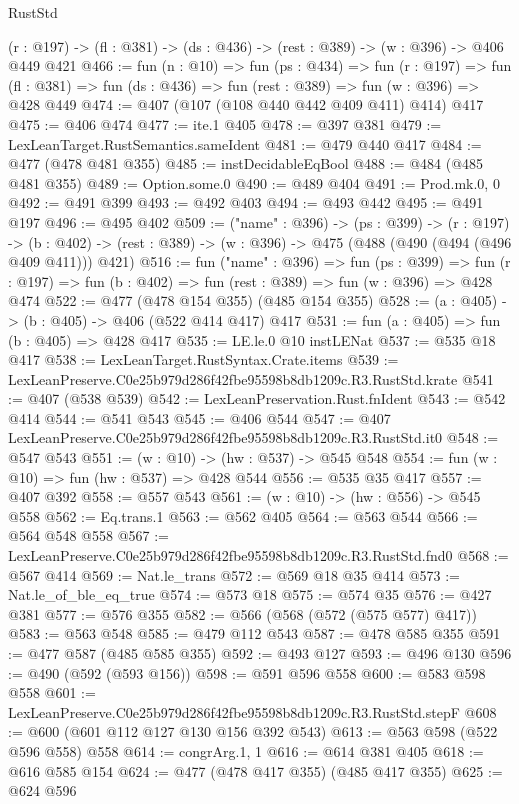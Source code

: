 \begin{lexlean}{RustStd}
\begin{coremodule}
  (r : @197) -> (fl : @381) -> (ds : @436) -> (rest : @389) -> (w : @396) -> @406 @449 @421
@466 := fun (n : @10) =>
  fun (ps : @434) =>
  fun (r : @197) =>
  fun (fl : @381) => fun (ds : @436) => fun (rest : @389) => fun (w : @396) => @428 @449
@474 := @407 (@107 (@108 @440 @442 @409 @411) @414) @417
@475 := @406 @474
@477 := ite.{1} @405
@478 := @397 @381
@479 := LexLeanTarget.RustSemantics.sameIdent
@481 := @479 @440 @417
@484 := @477 (@478 @481 @355)
@485 := instDecidableEqBool
@488 := @484 (@485 @481 @355)
@489 := Option.some.{0}
@490 := @489 @404
@491 := Prod.mk.{0, 0}
@492 := @491 @399
@493 := @492 @403
@494 := @493 @442
@495 := @491 @197
@496 := @495 @402
@509 := ("name" : @396) ->
  (ps : @399) ->
  (r : @197) ->
  (b : @402) -> (rest : @389) -> (w : @396) -> @475 (@488 (@490 (@494 (@496 @409 @411))) @421)
@516 := fun ("name" : @396) =>
  fun (ps : @399) =>
  fun (r : @197) => fun (b : @402) => fun (rest : @389) => fun (w : @396) => @428 @474
@522 := @477 (@478 @154 @355) (@485 @154 @355)
@528 := (a : @405) -> (b : @405) -> @406 (@522 @414 @417) @417
@531 := fun (a : @405) => fun (b : @405) => @428 @417
@535 := LE.le.{0} @10 instLENat
@537 := @535 @18 @417
@538 := LexLeanTarget.RustSyntax.Crate.items
@539 := LexLeanPreserve.C0e25b979d286f42fbe95598b8db1209c.R3.RustStd.krate
@541 := @407 (@538 @539)
@542 := LexLeanPreservation.Rust.fnIdent
@543 := @542 @414
@544 := @541 @543
@545 := @406 @544
@547 := @407 LexLeanPreserve.C0e25b979d286f42fbe95598b8db1209c.R3.RustStd.it0
@548 := @547 @543
@551 := (w : @10) -> (hw : @537) -> @545 @548
@554 := fun (w : @10) => fun (hw : @537) => @428 @544
@556 := @535 @35 @417
@557 := @407 @392
@558 := @557 @543
@561 := (w : @10) -> (hw : @556) -> @545 @558
@562 := Eq.trans.{1}
@563 := @562 @405
@564 := @563 @544
@566 := @564 @548 @558
@567 := LexLeanPreserve.C0e25b979d286f42fbe95598b8db1209c.R3.RustStd.fnd0
@568 := @567 @414
@569 := Nat.le_trans
@572 := @569 @18 @35 @414
@573 := Nat.le_of_ble_eq_true
@574 := @573 @18
@575 := @574 @35
@576 := @427 @381
@577 := @576 @355
@582 := @566 (@568 (@572 (@575 @577) @417))
@583 := @563 @548
@585 := @479 @112 @543
@587 := @478 @585 @355
@591 := @477 @587 (@485 @585 @355)
@592 := @493 @127
@593 := @496 @130
@596 := @490 (@592 (@593 @156))
@598 := @591 @596 @558
@600 := @583 @598 @558
@601 := LexLeanPreserve.C0e25b979d286f42fbe95598b8db1209c.R3.RustStd.stepF
@608 := @600 (@601 @112 @127 @130 @156 @392 @543)
@613 := @563 @598 (@522 @596 @558) @558
@614 := congrArg.{1, 1}
@616 := @614 @381 @405
@618 := @616 @585 @154
@624 := @477 (@478 @417 @355) (@485 @417 @355)
@625 := @624 @596

\end{coremodule}
\end{lexlean}
